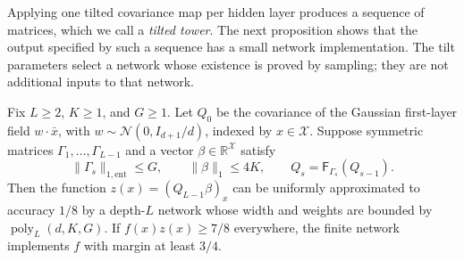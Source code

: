 Applying one tilted covariance map per hidden layer produces a sequence
of matrices, which we call a \emph{tilted tower}. The next proposition
shows that the output specified by such a sequence has a small network
implementation. The tilt parameters select a network whose existence is
proved by sampling; they are not additional inputs to that network.

\begin{proposition}\label{prop:tilt-compress}
Fix $L\geq2$, $K\geq1$, and $G\geq1$. Let $Q_0$ be the covariance of the
Gaussian first-layer field $w\cdot\bar x$, with
$w\sim\mathcal N(0,I_{d+1}/d)$, indexed by $x\in\mathcal X$.
Suppose symmetric matrices $\Gamma_1,\ldots,\Gamma_{L-1}$ and a vector
$\beta\in\mathbb R^{\mathcal X}$ satisfy
\[
 \|\Gamma_s\|_{1,\mathrm{ent}}\leq G,\qquad
 \|\beta\|_1\leq4K,
 \qquad Q_s=\mathsf F_{\Gamma_s}(Q_{s-1}).
\]
Then the function $z(x)=(Q_{L-1}\beta)_x$ can be uniformly approximated to
accuracy $1/8$ by a depth-$L$ network whose width and weights are bounded by
$\operatorname{poly}_L(d,K,G)$.
If $f(x)z(x)\geq7/8$ everywhere, the finite network implements $f$ with margin at least $3/4$.
\end{proposition}
